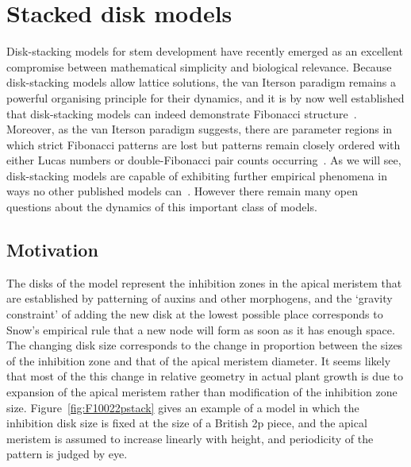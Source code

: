 
\chapter{Stacked disk models}
\label{ch:stackeddisk}

Disk-stacking models for stem development have recently emerged as an excellent compromise between mathematical simplicity and biological relevance. 
Because disk-stacking models allow lattice solutions,  the van Iterson paradigm remains a powerful organising principle for their dynamics, and it is by now well established that disk-stacking models can indeed demonstrate Fibonacci structure~\cite{goleFibonacciQuasisymmetricPhyllotaxis2016}. Moreover, as the van Iterson paradigm suggests, there are parameter regions in which strict Fibonacci patterns are lost but patterns remain closely ordered with either Lucas numbers or double-Fibonacci pair counts occurring~\cite{goleFibonacciQuasisymmetricPhyllotaxis2016,yonekuraMathematicalModelStudies2019}.
As we will see, disk-stacking models are capable of exhibiting further empirical phenomena in ways no other published models can~\cite{swintonDiskstackingModelsAre2024}. However there remain many open questions about the dynamics of this important class of models.


\clearpage
\section{Motivation}
The disks of the model represent the inhibition zones in the apical meristem that are established by patterning of auxins and other morphogens, and the `gravity constraint' of adding the new disk at the lowest possible place corresponds to Snow's empirical rule that a new node will form as soon as it has enough space. The changing disk size corresponds to the change in proportion between the sizes of the inhibition zone and that of the apical meristem diameter. It seems likely that most of the this change in relative geometry in actual plant growth is due to expansion of the apical meristem rather than modification of the inhibition zone size. Figure~\ref{fig:F10022pstack} gives an example of a model in which the inhibition disk size is fixed at the size of a British 2p piece, and the apical meristem is assumed to increase linearly with height, and periodicity of the pattern is judged by eye. 

